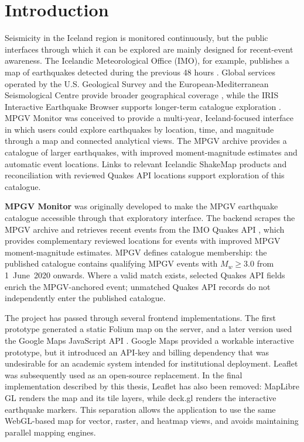 \documentclass[12pt]{article}
\begin{document}
\section{Introduction}
\label{sec:introduction}
Seismicity in the Iceland region is monitored continuously, but the public interfaces through which it can be explored are mainly designed for recent-event awareness. The Icelandic Meteorological Office (IMO), for example, publishes a map of earthquakes detected during the previous 48 hours \cite{imo_quakes_48h}. Global services operated by the U.S. Geological Survey and the European-Mediterranean Seismological Centre provide broader geographical coverage \cite{usgs_latest_map,emsc_home}, while the IRIS Interactive Earthquake Browser supports longer-term catalogue exploration \cite{iris_ieb_app}. MPGV Monitor was conceived to provide a multi-year, Iceland-focused interface in which users could explore earthquakes by location, time, and magnitude through a map and connected analytical views. The MPGV archive provides a catalogue of larger earthquakes, with improved moment-magnitude estimates and automatic event locations. Links to relevant Icelandic ShakeMap products and reconciliation with reviewed Quakes API locations support exploration of this catalogue.

\textbf{MPGV Monitor} was originally developed to make the MPGV earthquake catalogue \cite{imo_mpgv_archive_index} accessible through that exploratory interface. The backend scrapes the MPGV archive and retrieves recent events from the IMO Quakes API \cite{imo_quakes_api}, which provides complementary reviewed locations for events with improved MPGV moment-magnitude estimates. MPGV defines catalogue membership: the published catalogue contains qualifying MPGV events with $M_w \geq 3.0$ from 1~June~2020 onwards. Where a valid match exists, selected Quakes API fields enrich the MPGV-anchored event; unmatched Quakes API records do not independently enter the published catalogue.

The project has passed through several frontend implementations. The first prototype generated a static Folium map \cite{folium_docs} on the server, and a later version used the Google Maps JavaScript API \cite{google_maps_js_docs}. Google Maps provided a workable interactive prototype, but it introduced an API-key and billing dependency that was undesirable for an academic system intended for institutional deployment. Leaflet \cite{leaflet_docs} was subsequently used as an open-source replacement. In the final implementation described by this thesis, Leaflet has also been removed: MapLibre GL \cite{maplibre_gl_js_docs} renders the map and its tile layers, while deck.gl \cite{deck_gl_docs} renders the interactive earthquake markers. This separation allows the application to use the same WebGL-based map for vector, raster, and heatmap views, and avoids maintaining parallel mapping engines.
\end{document}
